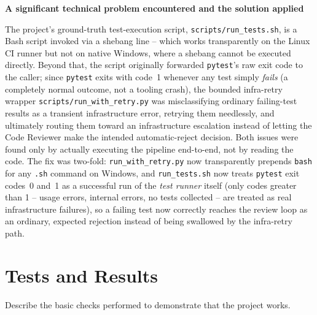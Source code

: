 \documentclass[11pt,a4paper]{article}
\newcommand{\sectionintro}[1]{\textcolor{courseGray}{\small #1}\par\vspace{2pt}}
\newcommand{\answerarea}[2]{\textbf{#1}\par\begin{answerbox}#2\end{answerbox}}
\begin{document}
\answerarea{A significant technical problem encountered and the solution applied}{
The project's ground-truth test-execution script, \texttt{scripts/run\_tests.sh}, is a Bash
script invoked via a shebang line -- which works transparently on the Linux CI runner but
not on native Windows, where a shebang cannot be executed directly. Beyond that, the script
originally forwarded \texttt{pytest}'s raw exit code to the caller; since \texttt{pytest}
exits with code~1 whenever any test simply \emph{fails} (a completely normal outcome, not a
tooling crash), the bounded infra-retry wrapper \texttt{scripts/run\_with\_retry.py} was
misclassifying ordinary failing-test results as a transient infrastructure error, retrying
them needlessly, and ultimately routing them toward an infrastructure escalation instead of
letting the Code Reviewer make the intended automatic-reject decision. Both issues were
found only by actually executing the pipeline end-to-end, not by reading the code. The fix
was two-fold: \texttt{run\_with\_retry.py} now transparently prepends \texttt{bash} for any
\texttt{.sh} command on Windows, and \texttt{run\_tests.sh} now treats \texttt{pytest} exit
codes~0 and~1 as a successful run of the \emph{test runner} itself (only codes greater than
1 -- usage errors, internal errors, no tests collected -- are treated as real infrastructure
failures), so a failing test now correctly reaches the review loop as an ordinary, expected
rejection instead of being swallowed by the infra-retry path.
}

\section{Tests and Results}
\sectionintro{Describe the basic checks performed to demonstrate that the project works.}
\end{document}
